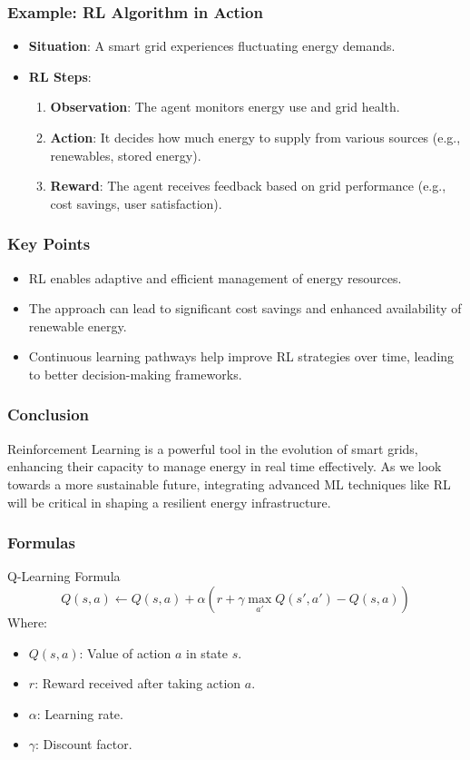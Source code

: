 \documentclass[aspectratio=169]{beamer}
\begin{document}
\begin{frame}[fragile]
  \frametitle{Example: RL Algorithm in Action}
  \begin{itemize}
    \item \textbf{Situation}: A smart grid experiences fluctuating energy demands.
    \item \textbf{RL Steps}:
      \begin{enumerate}
        \item \textbf{Observation}: The agent monitors energy use and grid health.
        \item \textbf{Action}: It decides how much energy to supply from various sources (e.g., renewables, stored energy).
        \item \textbf{Reward}: The agent receives feedback based on grid performance (e.g., cost savings, user satisfaction).
      \end{enumerate}
  \end{itemize}
\end{frame}

\begin{frame}[fragile]
  \frametitle{Key Points}
  \begin{itemize}
    \item RL enables adaptive and efficient management of energy resources.
    \item The approach can lead to significant cost savings and enhanced availability of renewable energy.
    \item Continuous learning pathways help improve RL strategies over time, leading to better decision-making frameworks.
  \end{itemize}
\end{frame}

\begin{frame}[fragile]
  \frametitle{Conclusion}
  Reinforcement Learning is a powerful tool in the evolution of smart grids, enhancing their capacity to manage energy in real time effectively. As we look towards a more sustainable future, integrating advanced ML techniques like RL will be critical in shaping a resilient energy infrastructure.
\end{frame}

\begin{frame}[fragile]
  \frametitle{Formulas}
  \begin{block}{Q-Learning Formula}
    \[
    Q(s, a) \leftarrow Q(s, a) + \alpha \left( r + \gamma \max_{a'} Q(s', a') - Q(s, a) \right)
    \]
    Where:
    \begin{itemize}
      \item \(Q(s, a)\): Value of action \(a\) in state \(s\).
      \item \(r\): Reward received after taking action \(a\).
      \item \(\alpha\): Learning rate.
      \item \(\gamma\): Discount factor.
    \end{itemize}
  \end{block}
\end{frame}
\end{document}
